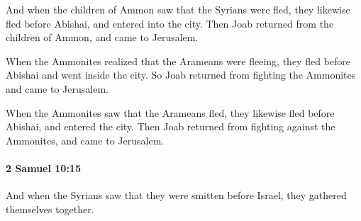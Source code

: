 			\begin{versebox}
					\item[BHS] 
					\item[ASV] And when the children of Ammon saw that the Syrians were fled, they likewise fled before Abishai, and entered into the city. Then Joab returned from the children of Ammon, and came to Jerusalem.
					\item[NIV] When the Ammonites realized that the Arameans were fleeing, they fled before Abishai and went inside the city. So Joab returned from fighting the Ammonites and came to Jerusalem.
					\item[NRSV] When the Ammonites saw that the Arameans fled, they likewise fled before Abishai, and entered the city. Then Joab returned from fighting against the Ammonites, and came to Jerusalem.
			\end{versebox}

		\paragraph{2 Samuel 10:15} %
			\label{2SAMUEL-10-15}

			And when the Syrians saw that they were smitten before Israel, they gathered themselves together.

